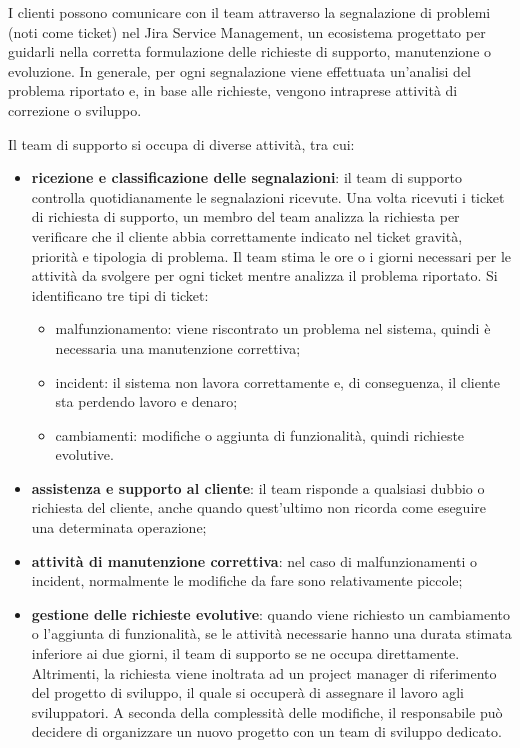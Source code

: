     I clienti possono comunicare con il team attraverso la segnalazione di problemi (noti come ticket) nel Jira Service Management, un ecosistema progettato per
    guidarli nella corretta formulazione delle richieste di supporto, manutenzione o evoluzione. In generale, per ogni segnalazione viene effettuata un'analisi
    del problema riportato e, in base alle richieste, vengono intraprese attività di correzione o sviluppo. 

    Il team di supporto si occupa di diverse attività, tra cui:
    \begin{itemize}
        \item \textbf{ricezione e classificazione delle segnalazioni}: il team di supporto controlla quotidianamente le segnalazioni ricevute. Una volta ricevuti
        i ticket di richiesta di supporto, un membro del team analizza la richiesta per verificare che il cliente abbia correttamente indicato nel ticket gravità,
        priorità e tipologia di problema. Il team stima le ore o i giorni necessari per le attività da svolgere per ogni ticket mentre analizza il problema riportato. Si identificano tre tipi di ticket: 
            \begin{itemize}
                \item malfunzionamento: viene riscontrato un problema nel sistema, quindi è necessaria una manutenzione correttiva;
                \item incident: il sistema non lavora correttamente e, di conseguenza, il cliente sta perdendo lavoro e denaro;
                \item cambiamenti: modifiche o aggiunta di funzionalità, quindi richieste evolutive.
            \end{itemize}
        \item \textbf{assistenza e supporto al cliente}: il team risponde a qualsiasi dubbio o richiesta del cliente, anche quando quest'ultimo non ricorda come eseguire una determinata operazione;
        \item \textbf{attività di manutenzione correttiva}: nel caso di malfunzionamenti o incident, normalmente le modifiche da fare sono relativamente piccole;
        \item \textbf{gestione delle richieste evolutive}: quando viene richiesto un cambiamento o l'aggiunta di funzionalità, se le attività necessarie hanno
        una durata stimata inferiore ai due giorni, il team di supporto se ne occupa direttamente. Altrimenti, la richiesta viene inoltrata ad un project manager di
        riferimento del progetto di sviluppo, il quale si occuperà di assegnare il lavoro agli sviluppatori. A seconda della complessità delle modifiche, il responsabile
        può decidere di organizzare un nuovo progetto con un team di sviluppo dedicato.        
    \end{itemize}

